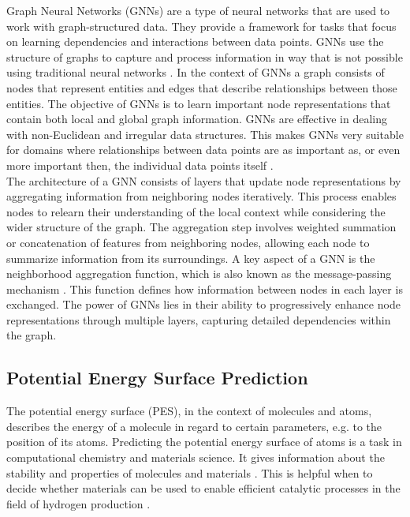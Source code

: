 Graph Neural Networks (GNNs) are a type of neural networks that are used to work with graph-structured data. They provide a framework for tasks that focus on learning dependencies and interactions between data points. GNNs use the structure of graphs to capture and process information in way that is not possible using traditional neural networks \cite{duvenaud2015convolutional}. In the context of GNNs a graph consists of nodes that represent entities and edges that describe relationships between those entities. The objective of GNNs is to learn important node representations that contain both local and global graph information. \cite{wu_comprehensive_2021} GNNs are effective in dealing with non-Euclidean and irregular data structures. This makes GNNs very suitable for domains where relationships between data points are as important as, or even more important then, the individual data points itself \cite{zhou_graph_2020}. \\

The architecture of a GNN consists of layers that update node representations by aggregating information from neighboring nodes iteratively. This process enables nodes to relearn their understanding of the local context while considering the wider structure of the graph. The aggregation step involves weighted summation or concatenation of features from neighboring nodes, allowing each node to summarize information from its surroundings. \cite{velickovic_everything_2023, xu_how_2019} A key aspect of a GNN is the neighborhood aggregation function, which is also known as the message-passing mechanism \cite{gasteiger_directional_2022}. This function defines how information between nodes in each layer is exchanged. The power of GNNs lies in their ability to progressively enhance node representations through multiple layers, capturing detailed dependencies within the graph. 

\subsection{Potential Energy Surface Prediction}
The potential energy surface (PES), in the context of molecules and atoms, describes the energy of a molecule in regard to certain parameters, e.g. to the position of its atoms.    
Predicting the potential energy surface of atoms is a task in computational chemistry and materials science. It gives information about the stability and properties of molecules and materials \cite{liu_computational_2023}. This is helpful when to decide whether materials can be used to enable efficient catalytic processes in the field of hydrogen production \cite{chen_waste-derived_2023}. 

